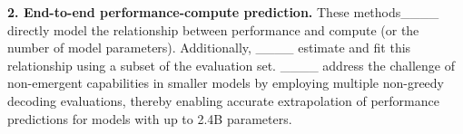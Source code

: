 \noindent\textbf{2. End-to-end performance-compute prediction.}
These methods____ directly model the relationship between performance and compute (or the number of model parameters). Additionally, ____ estimate and fit this relationship using a subset of the evaluation set. ____ address the challenge of non-emergent capabilities in smaller models by employing multiple non-greedy decoding evaluations, thereby enabling accurate extrapolation of performance predictions for models with up to 2.4B parameters.










%